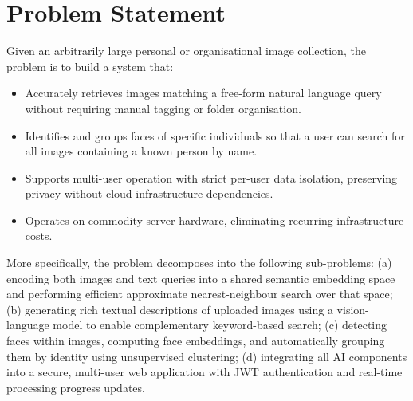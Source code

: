 \documentclass[12pt,a4paper,oneside]{report}
\begin{document}
\section{Problem Statement}
Given an arbitrarily large personal or organisational image collection,
the problem is to build a system that:
\begin{itemize}[leftmargin=*]
  \item Accurately retrieves images matching a free-form natural language
        query without requiring manual tagging or folder organisation.
  \item Identifies and groups faces of specific individuals so that a user
        can search for all images containing a known person by name.
  \item Supports multi-user operation with strict per-user data isolation,
        preserving privacy without cloud infrastructure dependencies.
  \item Operates on commodity server hardware, eliminating recurring
        infrastructure costs.
\end{itemize}

More specifically, the problem decomposes into the following sub-problems:
(a) encoding both images and text queries into a shared semantic embedding
space and performing efficient approximate nearest-neighbour search over that
space; (b) generating rich textual descriptions of uploaded images using a
vision-language model to enable complementary keyword-based search;
(c) detecting faces within images, computing face embeddings, and
automatically grouping them by identity using unsupervised clustering;
(d) integrating all AI components into a secure, multi-user web application
with JWT authentication and real-time processing progress updates.
\end{document}

